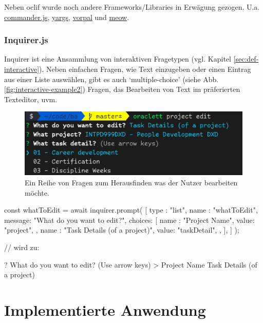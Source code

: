 \documentclass[oneside,bibliography=totocnumbered,BCOR=5mm]{scrbook}
\newenvironment{code}{\captionsetup{type=listing, skip=0pt}}{}
\begin{document}
Neben oclif wurde noch andere Frameworks/Libraries in Erwägung gezogen. U.a.
\href{https://github.com/tj/commander.js}{commander.js},
\href{https://github.com/yargs/yargs}{yargs},
\href{https://github.com/dthree/vorpal}{vorpal} und
\href{https://github.com/sindresorhus/meow}{meow}.

\subsubsection{Inquirer.js}

Inquirer ist eine Ansammlung von interaktiven Fragetypen (vgl. Kapitel
\ref{sec:def-interactive}). Neben einfachen Fragen, wie Text einzugeben oder
einen Eintrag aus einer Liste auswählen, gibt es auch `multiple-choice' (siehe
Abb. \ref{fig:interactive-example2}) Fragen, das Bearbeiten von Text im
präferierten Texteditor, uvm.

\begin{figure}[H]
  \centering
  \includegraphics[scale=0.5]{inquirer-example.png}
  \caption{Ein Reihe von Fragen zum Herausfinden was der Nutzer bearbeiten möchte.}
  \label{fig:inquirer-example}
\end{figure}

\begin{code}
  \begin{javascriptcode}
const { whatToEdit } = await inquirer.prompt( [ {
  type   : "list",
  name   : "whatToEdit",
  message: "What do you want to edit?",
  choices: [
    {
      name : "Project Name",
      value: "project",
    },
    {
      name : "Task Details (of a project)",
      value: "taskDetail",
    },
  ],
} ] );

// wird zu:

? What do you want to edit? (Use arrow keys)
> Project Name
  Task Details (of a project)
  \end{javascriptcode}
  \medskip
\end{code}

\section{Implementierte Anwendung}
\end{document}

